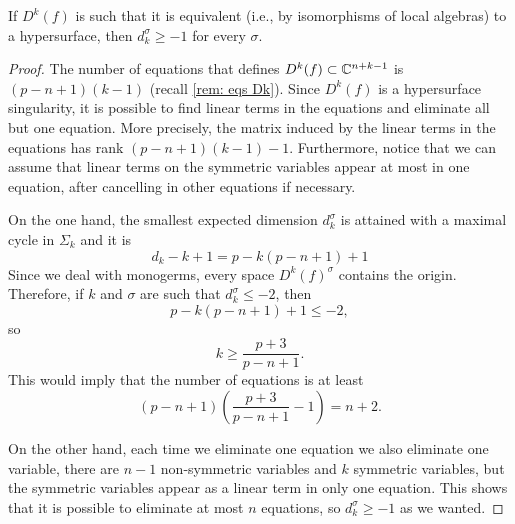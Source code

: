 \documentclass[a4paper,12pt]{amsart}
\begin{document}
\begin{lemma}\label{lem:paramain2}
If $D^k(f)$ is such that it is equivalent (i.e., by isomorphisms of local algebras) to a hypersurface, then $d_k^\sigma\geq -1$ for every $\sigma$.
\end{lemma}
\begin{proof}
The number of equations that defines $D^k(f)\subset \mathbb{C}^{n+k-1}$ is $(p-n+1)(k-1)$ (recall \cref{rem: eqs Dk}). Since $D^k(f)$ is a hypersurface singularity, it is possible to find linear terms in the equations and eliminate all but one equation. More precisely, the matrix induced by the linear terms in the equations has rank $(p-n+1)(k-1)-1$. Furthermore, notice that we can assume that linear terms on the symmetric variables appear at most in one equation, after cancelling in other equations if necessary.


On the one hand, the smallest expected dimension $d_k^\sigma$ is attained with a maximal cycle in $\Sigma_k$ and it is
\[d_k-k+1=p-k(p-n+1)+1\]
Since we deal with monogerms, every space $D^k(f)^\sigma$ contains the origin. Therefore, if $k$ and $\sigma$ are such that $d_k^\sigma\leq-2$, then
\[p-k(p-n+1)+1\leq -2,\]
so
\[ k \geq \frac{p+3}{p-n+1}.\]
This would imply that the number of equations is at least
\[ (p-n+1)\left(\frac{p+3}{p-n+1}-1\right)=n+2. \]

On the other hand, each time we eliminate one equation we also eliminate one variable, there are $n-1$ non-symmetric variables and $k$ symmetric variables, but the symmetric variables appear as a linear term in only one equation. This shows that it is possible to eliminate at most $n$ equations, so $d_k^\sigma\geq -1$ as we wanted.
\end{proof}
\end{document}
